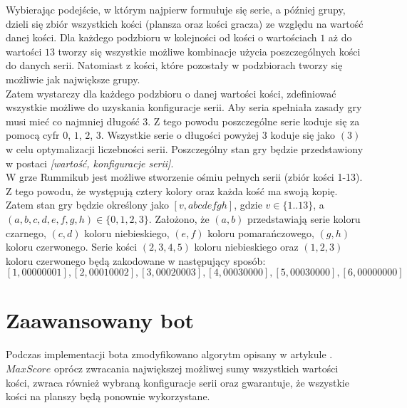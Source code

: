 Wybierając podejście, w którym najpierw formułuje się serie, a później grupy, dzieli się zbiór wszystkich kości (plansza oraz kości gracza) ze względu na wartość danej kości. Dla każdego podzbioru w kolejności od kości o wartościach $1$ aż do wartości $13$ tworzy się wszystkie możliwe kombinacje użycia poszczególnych kości do danych serii. Natomiast z kości, które pozostały w podzbiorach tworzy się możliwie jak największe grupy. \\

Zatem wystarczy dla każdego podzbioru o danej wartości kości, zdefiniować wszystkie możliwe do uzyskania konfiguracje serii. Aby seria spełniała zasady gry musi mieć co najmniej długość $3$. Z tego powodu poszczególne serie koduje się za pomocą cyfr $0$, $1$, $2$, $3$.  Wszystkie serie o długości powyżej $3$ koduje się jako $(3)$ w celu optymalizacji liczebności serii. Poszczególny stan gry będzie przedstawiony w postaci \emph{[wartość, konfiguracje serii]}. \\

W grze Rummikub jest możliwe stworzenie ośmiu pełnych serii (zbiór kości 1-13). Z tego powodu, że występują cztery kolory oraz każda kość ma swoją kopię. Zatem stan gry będzie określony jako $[v, abcdefgh]$, gdzie $v \in \{1..13\}$, a $(a, b, c, d, e, f, g, h) \in \{0, 1, 2, 3\}$. Założono, że $(a, b)$ przedstawiają serie koloru czarnego, $(c, d)$ koloru niebieskiego, $(e, f)$ koloru pomarańczowego, $(g, h)$ koloru czerwonego. Serie kości $(2, 3, 4, 5)$ koloru niebieskiego oraz $(1, 2, 3)$ koloru czerwonego będą zakodowane w następujący sposób: $$[1, 00000001], [2, 00010002], [3, 00020003], [4, 00030000], [5, 00030000], [6, 00000000]$$

\section{Zaawansowany bot}

Podczas implementacji bota zmodyfikowano algorytm opisany w artykule \cite{RummikubComplexity}. $MaxScore$ oprócz zwracania największej możliwej sumy wszystkich wartości kości, zwraca również wybraną konfiguracje serii oraz gwarantuje, że wszystkie kości na planszy będą ponownie wykorzystane. \\

